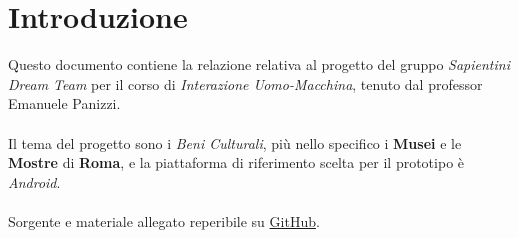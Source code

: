 \section{Introduzione}

Questo documento contiene la relazione relativa al progetto del gruppo \textit{Sapientini Dream Team} per il corso di \textit{Interazione Uomo-Macchina}, tenuto dal professor Emanuele Panizzi.

\paragraph{}
Il tema del progetto sono i \textit{Beni Culturali}, più nello specifico i \textbf{Musei} e le \textbf{Mostre} di \textbf{Roma}, e la piattaforma di riferimento scelta per il prototipo è \textit{Android}. 

\paragraph{}
Sorgente e materiale allegato reperibile su \href{https://github.com/andrea-gasparini/progetto-interazione-uomo-macchina}{GitHub}.